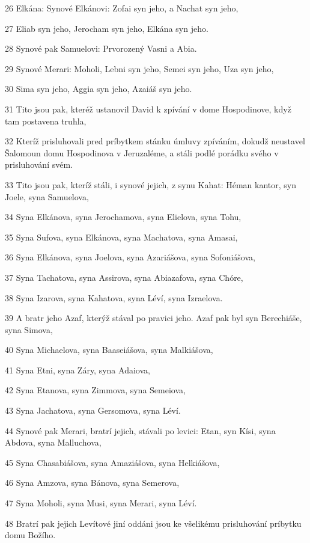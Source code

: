 \par 26 Elkána: Synové Elkánovi: Zofai syn jeho, a Nachat syn jeho,
\par 27 Eliab syn jeho, Jerocham syn jeho, Elkána syn jeho.
\par 28 Synové pak Samuelovi: Prvorozený Vasni a Abia.
\par 29 Synové Merari: Moholi, Lebni syn jeho, Semei syn jeho, Uza syn jeho,
\par 30 Sima syn jeho, Aggia syn jeho, Azaiáš syn jeho.
\par 31 Tito jsou pak, kteréž ustanovil David k zpívání v dome Hospodinove, když tam postavena truhla,
\par 32 Kteríž prisluhovali pred príbytkem stánku úmluvy zpíváním, dokudž neustavel Šalomoun domu Hospodinova v Jeruzaléme, a stáli podlé porádku svého v prisluhování svém.
\par 33 Tito jsou pak, kteríž stáli, i synové jejich, z synu Kahat: Héman kantor, syn Joele, syna Samuelova,
\par 34 Syna Elkánova, syna Jerochamova, syna Elielova, syna Tohu,
\par 35 Syna Sufova, syna Elkánova, syna Machatova, syna Amasai,
\par 36 Syna Elkánova, syna Joelova, syna Azariášova, syna Sofoniášova,
\par 37 Syna Tachatova, syna Assirova, syna Abiazafova, syna Chóre,
\par 38 Syna Izarova, syna Kahatova, syna Léví, syna Izraelova.
\par 39 A bratr jeho Azaf, kterýž stával po pravici jeho. Azaf pak byl syn Berechiáše, syna Simova,
\par 40 Syna Michaelova, syna Baaseiášova, syna Malkiášova,
\par 41 Syna Etni, syna Záry, syna Adaiova,
\par 42 Syna Etanova, syna Zimmova, syna Semeiova,
\par 43 Syna Jachatova, syna Gersomova, syna Léví.
\par 44 Synové pak Merari, bratrí jejich, stávali po levici: Etan, syn Kísi, syna Abdova, syna Malluchova,
\par 45 Syna Chasabiášova, syna Amaziášova, syna Helkiášova,
\par 46 Syna Amzova, syna Bánova, syna Semerova,
\par 47 Syna Moholi, syna Musi, syna Merari, syna Léví.
\par 48 Bratrí pak jejich Levítové jiní oddáni jsou ke všelikému prisluhování príbytku domu Božího.

